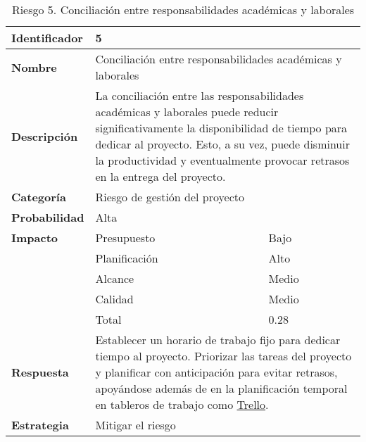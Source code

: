 \begin{table}[H]
    \centering
    \caption{Riesgo 5. Conciliación entre responsabilidades académicas y laborales}
    \label{table:risk_conciliacion}
    \begin{tabular}{>{\columncolor{lightgreen!20}}l l l}
    \toprule
    \rowcolor{lightgreen}
    \textbf{Identificador} & \multicolumn{2}{l}{5} \\
    \midrule
    \textbf{Nombre} & \multicolumn{2}{l}{Conciliación entre responsabilidades académicas y laborales} \\
    \midrule
    \textbf{Descripción} & \multicolumn{2}{p{10cm}}{La conciliación entre las responsabilidades académicas y laborales puede reducir significativamente la disponibilidad de tiempo para dedicar al proyecto. Esto, a su vez, puede disminuir la productividad y eventualmente provocar retrasos en la entrega del proyecto.} \\
    \midrule
    \textbf{Categoría} & \multicolumn{2}{l}{Riesgo de gestión del proyecto} \\
    \midrule
    \textbf{Probabilidad} & \multicolumn{2}{l}{Alta} \\
    \midrule
    \textbf{Impacto} & Presupuesto & Bajo \\
    \cmidrule(lr){2-3}
    & Planificación & Alto \\
    \cmidrule(lr){2-3}
    & Alcance & Medio \\
    \cmidrule(lr){2-3}
    & Calidad & Medio \\
    \cmidrule(lr){2-3}
    & Total & 0.28 \\
    \midrule
    \textbf{Respuesta} & \multicolumn{2}{p{10cm}}{Establecer un horario de trabajo fijo para dedicar tiempo al proyecto. Priorizar las tareas del proyecto y planificar con anticipación para evitar retrasos, apoyándose además de en la planificación temporal en tableros de trabajo como \href{https://trello.com/es}{Trello}.} \\
    \midrule
    \textbf{Estrategia} & \multicolumn{2}{l}{Mitigar el riesgo} \\
    \bottomrule
    \end{tabular}
\end{table}


